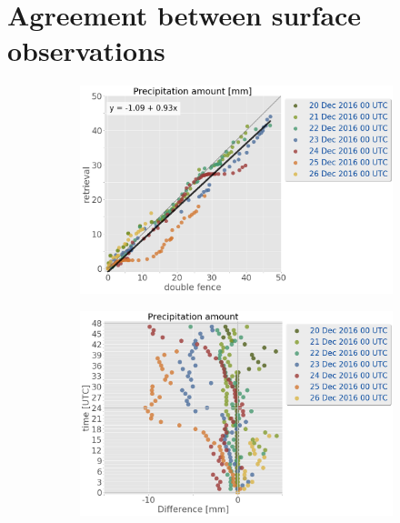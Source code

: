 \section{Agreement between surface observations} 
\begin{figure}[t]
	\centering
	\begin{subfigure}[b]{0.38\textwidth}
		\includegraphics[trim={0.cm 0.cm 13cm 0cm},clip,
		width=\textwidth]{./fig_obs_ret/obs_ret_20161220_26_00}
		\caption{}\label{fig:res:obs_ret_scatter}
	\end{subfigure}
	\begin{subfigure}[b]{0.59\textwidth}
		\includegraphics[trim={0.cm 0.cm 0cm 0cm},clip,
		width=\textwidth]{./fig_obs_ret/diff_20161220_26_00}
		\caption{}\label{fig:res:diff_ret_scatter}
	\end{subfigure}

\end{figure}
